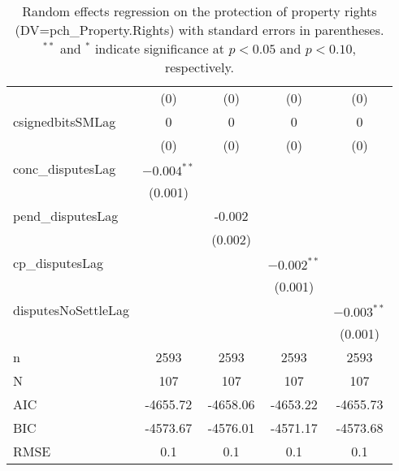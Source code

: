 \begin{table}[ht]
\begin{tabular}{lcccc}
   & (0) & (0) & (0) & (0) \\ 
  csignedbitsSMLag & 0 & 0 & 0 & 0 \\ 
   & (0) & (0) & (0) & (0) \\ 
  conc\_disputesLag & $-0.004^{\ast\ast}$ &  &  &  \\ 
   & (0.001) &  &  &  \\ 
  pend\_disputesLag &  & -0.002 &  &  \\ 
   &  & (0.002) &  &  \\ 
  cp\_disputesLag &  &  & $-0.002^{\ast\ast}$ &  \\ 
   &  &  & (0.001) &  \\ 
  disputesNoSettleLag &  &  &  & $-0.003^{\ast\ast}$ \\ 
   &  &  &  & (0.001) \\ 
   \hline
n & 2593 & 2593 & 2593 & 2593 \\ 
  N & 107 & 107 & 107 & 107 \\ 
  AIC & -4655.72 & -4658.06 & -4653.22 & -4655.73 \\ 
  BIC & -4573.67 & -4576.01 & -4571.17 & -4573.68 \\ 
  RMSE & 0.1 & 0.1 & 0.1 & 0.1 \\ 
   \hline
\hline
\end{tabular}
\caption{Random effects regression on the protection of property rights (DV=pch\_Property.Rights) with standard errors in parentheses. $^{**}$ and $^{*}$ indicate significance at $p< 0.05 $ and $p< 0.10 $, respectively.} 
\end{table}
